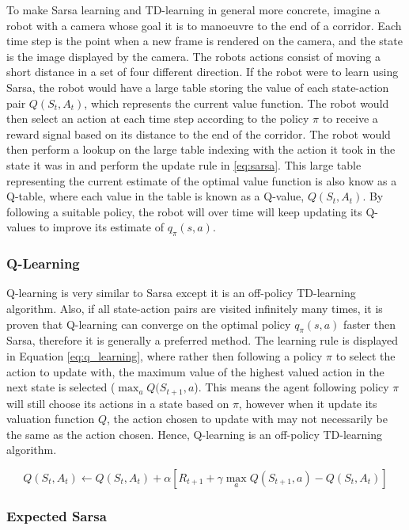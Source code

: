\documentclass[../dissertation.tex]{subfiles}
\begin{document}
To make Sarsa learning and TD-learning in general more concrete, imagine a robot with a camera whose goal it is to manoeuvre to the end of a corridor. Each time step is the point when a new frame is rendered on the camera, and the state is the image displayed by the camera. The robots actions consist of moving a short distance in a set of four different direction. If the robot were to learn using Sarsa, the robot would have a large table storing the value of each state-action pair $Q(S_t, A_t)$, which represents the current value function. The robot would then select an action at each time step according to the policy $\pi$ to receive a reward signal based on its distance to the end of the corridor. The robot would then perform a lookup on the large table indexing with the action it took in the state it was in and perform the update rule in \ref{eq:sarsa}. This large table representing the current estimate of the optimal value function is also know as a Q-table, where each value in the table is known as a Q-value, $Q(S_t, A_t)$. By following a suitable policy, the robot will over time will keep updating its Q-values to improve
its estimate of $q_\pi(s,a)$.

\subsubsection{Q-Learning}

Q-learning is very similar to Sarsa except it is an off-policy TD-learning algorithm. Also, if all state-action pairs are visited infinitely many times, it is proven that Q-learning can converge on the optimal policy $q_\pi(s,a)$ faster then Sarsa, therefore it is generally a preferred method. The learning rule is displayed in Equation \ref{eq:q_learning}, where rather then following a policy $\pi$ to select the action to update with, the maximum value of the highest valued action in the next state is selected ($\max_a Q(S_{t+1}, a$). This means the agent following policy $\pi$ will still choose its actions in a state based on $\pi$, however when it update its valuation function $Q$, the action chosen to update with may not necessarily be the same as the action chosen. Hence, Q-learning is an off-policy TD-learning algorithm.

\begin{equation}
Q(S_t, A_t) \leftarrow Q(S_t, A_t) + \alpha[R_{t+1} + \gamma \max_aQ(S_{t+1}, a) - Q(S_t, A_t)]
\end{equation}

\subsubsection{Expected Sarsa}
\end{document}
